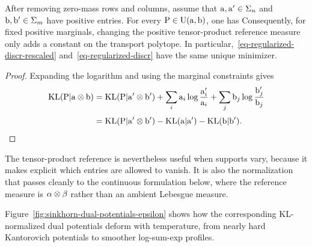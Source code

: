 \begin{prop}\label{prop-kl-shift}
	After removing zero-mass rows and columns, assume that $\mathrm{a},\mathrm{a}'\in\Sigma_n$ and $\mathrm{b},\mathrm{b}'\in\Sigma_m$ have positive entries. For every $\mathrm{P} \in \mathrm{U}(\mathrm{a},\mathrm{b})$, one has
Consequently, for fixed positive marginals, changing the positive tensor-product reference measure only adds a constant on the transport polytope. In particular,~\eqref{eq-regularized-discr-rescaled} and~\eqref{eq-regularized-discr} have the same unique minimizer.
\end{prop}

\begin{proof}
Expanding the logarithm and using the marginal constraints gives
\begin{align*}
	\mathrm{KL}(\mathrm{P}|\mathrm{a}\otimes\mathrm{b})
	&=
	\mathrm{KL}(\mathrm{P}|\mathrm{a}'\otimes\mathrm{b}')
	+
	\sum_i \mathrm{a}_i\log\frac{\mathrm{a}_i'}{\mathrm{a}_i}
	+
	\sum_j \mathrm{b}_j\log\frac{\mathrm{b}_j'}{\mathrm{b}_j} \\[.25em]
	&=
	\mathrm{KL}(\mathrm{P}|\mathrm{a}'\otimes\mathrm{b}')
	-\mathrm{KL}(\mathrm{a}|\mathrm{a}')-\mathrm{KL}(\mathrm{b}|\mathrm{b}').
\end{align*}
\end{proof}

The tensor-product reference is nevertheless useful when supports vary, because it makes explicit which entries are allowed to vanish. It is also the normalization that passes cleanly to the continuous formulation below, where the reference measure is $\alpha\otimes\beta$ rather than an ambient Lebesgue measure.

Figure~\ref{fig:sinkhorn-dual-potentials-epsilon} shows how the corresponding KL-normalized dual potentials deform with temperature, from nearly hard Kantorovich potentials to smoother log-sum-exp profiles.

